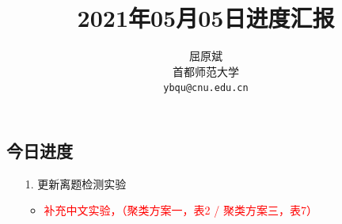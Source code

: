 \documentclass[11pt]{article}
\title{2021年05月05日进度汇报}
\author{屈原斌 \\
首都师范大学 \\
{\tt ybqu@cnu.edu.cn}}
\date{}
\begin{document}
\begin{CJK}{UTF8}{gkai}
\tableofcontents
  
\maketitle
\CJKindent


\section{今日进度}


\begin{itemize}
  \item [1.] 更新离题检测实验
  \begin{itemize}
    \item \textcolor{red}{补充中文实验，（聚类方案一，表2 / 聚类方案三，表7）}
  \end{itemize}
\end{itemize}


\end{CJK}
\end{document}

